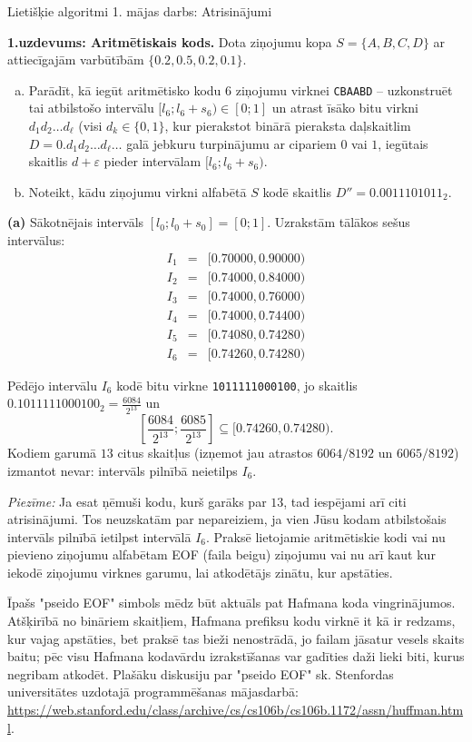 \documentclass[11pt]{article}
\begin{document}
\thispagestyle{empty}

{\Large Lietišķie algoritmi \textendash{} 1. mājas darbs: Atrisinājumi}


{\footnotesize
\noindent
{\bf 1.uzdevums: Aritmētiskais kods.}
Dota ziņojumu kopa $S = \{ A,B,C,D \}$ ar attiecīgajām varbūtībām 
$\{ 0.2, 0.5, 0.2, 0.1 \}$.
\begin{enumerate}[(a)]
\item Parādīt, kā iegūt aritmētisko kodu $6$ ziņojumu virknei {\tt CBAABD} -- uzkonstruēt
tai atbilstošo intervālu $[l_6;l_6+s_6) \in [0;1]$ un atrast 
īsāko bitu virkni $d_1d_2\ldots{}d_{\ell}$ (visi $d_k \in \{ 0,1 \}$, 
kur pierakstot binārā pieraksta daļskaitlim $D = 0.d_1d_2\ldots{}d_{\ell}\ldots$ 
galā jebkuru turpinājumu ar cipariem $0$ vai $1$, iegūtais skaitlis $d+\varepsilon$ pieder
intervālam $[l_6;l_6+s_6)$.
\item Noteikt, kādu ziņojumu virkni alfabētā $S$ kodē skaitlis 
$D'' = 0.0011101011_2$.
\end{enumerate}
}

\noindent
{\bf (a)} Sākotnējais intervāls $[l_0;l_0+s_0] = [0;1]$. Uzrakstām tālākos 
sešus intervālus: 
$$\begin{array}{rcl}
I_1 & = & [0.70000,0.90000)\\
I_2 & = & [0.74000,0.84000)\\
I_3 & = & [0.74000,0.76000)\\
I_4 & = & [0.74000,0.74400)\\
I_5 & = & [0.74080,0.74280)\\
I_6 & = & [0.74260,0.74280)
\end{array}$$

Pēdējo intervālu $I_6$ kodē bitu virkne {\tt 1011111000100}, jo 
skaitlis ${\displaystyle 0.1011111000100_2 = \frac{6084}{2^{13}}}$
un 
$$\left[ \frac{6084}{2^{13}}; \frac{6085}{2^{13}} \right] \subseteq [0.74260,0.74280).$$
Kodiem garumā $13$ citus skaitļus (izņemot jau atrastos $6064/8192$ un $6065/8192$) izmantot nevar: 
intervāls pilnībā neietilps $I_6$.

{\em Piezīme:} Ja esat ņēmuši kodu, kurš garāks par $13$, tad
iespējami arī citi atrisinājumi. Tos neuzskatām par nepareiziem, ja vien 
Jūsu kodam atbilstošais intervāls pilnībā ietilpst intervālā $I_6$. 
Praksē lietojamie aritmētiskie kodi vai nu pievieno ziņojumu 
alfabētam EOF (faila beigu) ziņojumu vai nu arī kaut kur 
iekodē ziņojumu virknes garumu, lai 
atkodētājs zinātu, kur apstāties. 

Īpašs "pseido EOF" simbols mēdz būt aktuāls pat Hafmana koda vingrinājumos. 
Atšķirībā no bināriem skaitļiem, Hafmana prefiksu kodu virknē it kā ir redzams, kur 
vajag apstāties, bet praksē tas bieži nenostrādā, jo failam jāsatur vesels skaits baitu; 
pēc visu Hafmana kodavārdu izrakstīšanas var gadīties daži lieki biti, kurus negribam atkodēt. 
Plašāku diskusiju par "pseido EOF" sk. Stenfordas universitātes uzdotajā programmēšanas mājasdarbā:\\
\url{https://web.stanford.edu/class/archive/cs/cs106b/cs106b.1172/assn/huffman.html}. 
\end{document}
